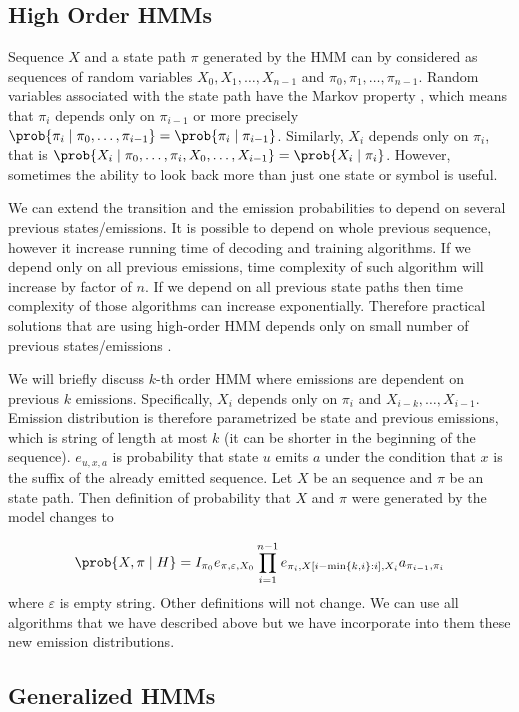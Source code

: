 \subsection{High Order HMMs}

Sequence $X$ and a state path $\pi$ generated by the HMM can by considered 
as sequences of random variables
$X_0,X_1,\dots, X_{n-1}$ and $\pi_0,\pi_1,\dots,\pi_{n-1}$.
Random variables associated with the state path have the Markov
property \cite{Levin2006}, which means that $\pi_i$ depends only on $\pi_{i-1}$ or
more precisely
$\prob{\pi_i\mid\pi_0,\dots,\pi_{i-1}}=\prob{\pi_i\mid\pi_{i-1}}$. Similarly,
$X_i$ depends only on $\pi_i$, that is
$\prob{X_i\mid\pi_0,\dots,\pi_i,X_0,\dots,X_{i-1}}=\prob{X_i\mid\pi_i}$.
However,
sometimes the  ability to look back more than just one state or symbol is useful.

We can extend the transition and the emission probabilities to depend on
several previous states/emissions. It is possible to depend on whole previous
sequence, however it increase running time of decoding and training algorithms.
If we depend only on all previous emissions, time complexity of such algorithm
will increase by factor of $n$. If we depend on all previous state paths then
time complexity of those algorithms can increase exponentially.  Therefore
practical solutions that are using high-order HMM depends only on small number
of previous states/emissions \cite{Brejova2005,Alexanderson2004}.

We will briefly discuss $k$-th order HMM where emissions are dependent on
previous $k$ emissions. Specifically, $X_i$ depends only on $\pi_i$ and
$X_{i-k},\dots,X_{i-1}$. Emission distribution is therefore parametrized be
state and previous emissions, which is string of length at most $k$ (it can be
shorter in the beginning of the sequence). $e_{u,x,a}$ is probability that
state $u$ emits $a$ under the condition that $x$ is the suffix of the already emitted
sequence. Let $X$ be an sequence and $\pi$ be an state path. Then definition
of probability that $X$ and $\pi$ were generated by the model changes to

\[
\prob{X,\pi\mid H} = 
I_{\pi_0}e_{\pi,\varepsilon,X_0}\prod_{i=1}^{n-1}
e_{\pi_i,X[i-\min\{k,i\}:i],X_i}a_{\pi_{i-1},\pi_i}
\]
where $\varepsilon$ is empty string. Other definitions will not change. We can
use all algorithms that we have described above but we have incorporate into
them these new emission distributions.

\subsection{Generalized HMMs}

